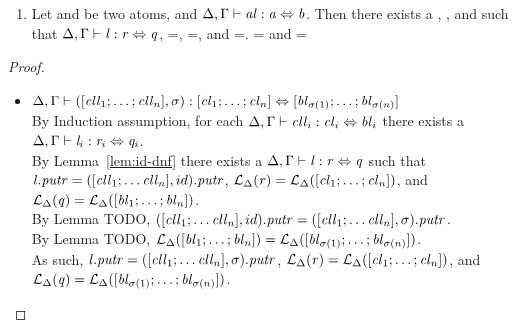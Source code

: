 \begin{lemma}
\begin{enumerate}
\item Let \Atom{} and \AtomAlt{} be two atoms, and $\Delta, \Gamma \vdash \mathit{al} : \mathit{a} \Leftrightarrow \mathit{b}$.  Then there exists a \Lens{}, \Regex{}, and \RegexAlt{} such that $\Delta, \Gamma \vdash \mathit{l} : \mathit{r} \Leftrightarrow \mathit{q}$, \PutRightOf{\Lens}=\PutRightOf{\AtomLens}, \LanguageOf{\Delta}{\Regex}=\LanguageOf{\Delta}{\Atom}, and \LanguageOf{\Delta}{\RegexAlt}=\LanguageOf{\Delta}{\AtomAlt}.  \LanguageOf{\Delta{}}{\Regex{}} = \LanguageOf{\Delta{}}{\Atom{}} and
\LanguageOf{\Delta{}}{\RegexAlt{}} = \LanguageOf{\Delta{}}{\AtomAlt{}}
\end{enumerate}
\begin{proof}
\begin{itemize}\leavevmode\\
\item $\Delta, \Gamma \vdash ([\mathit{cll}_1;\ldots;\mathit{cll}_n],\sigma) : [\mathit{cl}_1;\ldots;\mathit{cl}_n] \Leftrightarrow [\mathit{bl}_{\sigma(1)};\ldots;\mathit{bl}_{\sigma(n)}]$\\
By Induction assumption, for each $\Delta, \Gamma \vdash \mathit{cll}_i : \mathit{cl}_i \Leftrightarrow \mathit{bl}_i$ there exists a $\Delta, \Gamma \vdash \mathit{l}_i : \mathit{r}_i \Leftrightarrow \mathit{q}_i$.\\
By Lemma~\ref{lem:id-dnf} there exists a $\Delta, \Gamma \vdash \mathit{l} : \mathit{r} \Leftrightarrow \mathit{q}$ such that $\mathit{l}.\mathit{putr}=([\mathit{cll}_1;\ldots\mathit{cll}_n],id).\mathit{putr}$,
$\mathcal{L}_{\Delta}(\mathit{r})=\mathcal{L}_{\Delta}([\mathit{cl}_1;\ldots;\mathit{cl}_n])$, and
$\mathcal{L}_{\Delta}(\mathit{q})=\mathcal{L}_{\Delta}([\mathit{bl}_1;\ldots;\mathit{bl}_n])$.\\
By Lemma TODO, $([\mathit{cll}_1;\ldots\mathit{cll}_n],id).\mathit{putr}=([\mathit{cll}_1;\ldots\mathit{cll}_n],\sigma).\mathit{putr}$.\\
By Lemma TODO, $\mathcal{L}_{\Delta}([\mathit{bl}_1;\ldots;\mathit{bl}_n])=\mathcal{L}_{\Delta}([\mathit{bl}_{\sigma(1)};\ldots;\mathit{bl}_{\sigma(n)}])$.\\
As such, $\mathit{l}.\mathit{putr}=([\mathit{cll}_1;\ldots\mathit{cll}_n],\sigma).\mathit{putr}$,
$\mathcal{L}_{\Delta}(\mathit{r})=\mathcal{L}_{\Delta}([\mathit{cl}_1;\ldots;\mathit{cl}_n])$,
and $\mathcal{L}_{\Delta}(\mathit{q})=\mathcal{L}_{\Delta}([\mathit{bl}_{\sigma(1)};\ldots;\mathit{bl}_{\sigma(n)}])$.\\


\end{itemize}
\end{proof}
\end{lemma}
